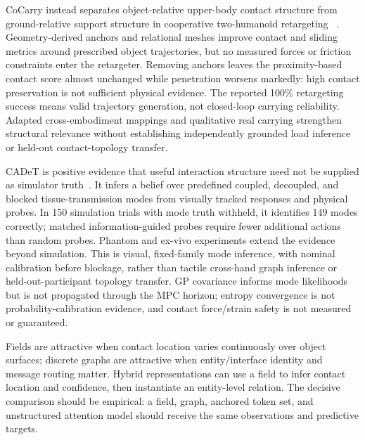 CoCarry instead separates object-relative upper-body contact structure from
ground-relative support structure in cooperative two-humanoid retargeting
~\cite{update2026cocarry}. Geometry-derived anchors and relational meshes improve
contact and sliding metrics around prescribed object trajectories, but no
measured forces or friction constraints enter the retargeter. Removing anchors
leaves the proximity-based contact score almost unchanged while penetration
worsens markedly: high contact preservation is not sufficient physical evidence.
The reported 100\% retargeting success means valid trajectory generation, not
closed-loop carrying reliability. Adapted cross-embodiment mappings and
qualitative real carrying strengthen structural relevance without establishing
independently grounded load inference or held-out contact-topology transfer.

CADeT is positive evidence that useful interaction structure need not be supplied
as simulator truth~\cite{hu2026cadet}. It infers a belief over predefined coupled,
decoupled, and blocked tissue-transmission modes from visually tracked responses
and physical probes. In 150 simulation trials with mode truth withheld, it
identifies 149 modes correctly; matched information-guided probes require fewer
additional actions than random probes. Phantom and ex-vivo experiments extend
the evidence beyond simulation. This is visual, fixed-family mode inference,
with nominal calibration before blockage, rather than tactile cross-hand graph
inference or held-out-participant topology transfer. GP covariance informs mode
likelihoods but is not propagated through the MPC horizon; entropy convergence
is not probability-calibration evidence, and contact force/strain safety is not
measured or guaranteed.

Fields are attractive when contact location varies continuously over object
surfaces; discrete graphs are attractive when entity/interface identity and
message routing matter. Hybrid representations can use a field to infer contact
location and confidence, then instantiate an entity-level relation. The decisive
comparison should be empirical: a field, graph, anchored token set, and
unstructured attention model should receive the same observations and predictive
targets.

